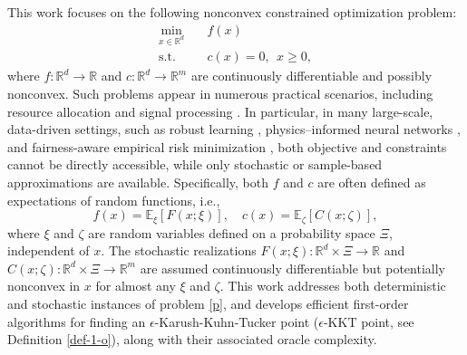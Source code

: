 \documentclass[11pt]{article}
\newcommand{\R}{\mathbb{R}}
\newcommand{\E}{\mathbb{E}}
\begin{document}
{This work focuses on} the following nonconvex constrained  optimization problem:
\begin{equation}\label{p}
\begin{aligned}
\min_{x \in \mathbb{R}^d} &\quad   f(x)  \\
\text{s.t.} &\quad c(x) = 0, ~~x \ge 0,
\end{aligned}
\end{equation}
where \(f: \R^d \to \R\) and \(c: \R^d \to \R^m\) are continuously differentiable and  possibly nonconvex. 
Such problems {appear in numerous practical scenarios,} including resource allocation \cite{yi2016initialization} and signal processing \cite{elbir2023twenty}. In particular, in many large-scale, data-driven settings, {such as} robust learning \cite{chamon2022constrained}, physics–informed neural networks \cite{cuomo2022scientific}, and fairness-aware empirical risk minimization \cite{donini2018empirical}, both objective and constraints cannot be directly accessible, while only stochastic or {sample-based} approximations are available. {Specifically, both $f$ and $c$ are often defined as expectations of random functions, i.e.,
\begin{equation}\label{inq-cons}
f(x) = \E_\xi [F(x; \xi)], \quad c(x) = \E_\zeta [C(x; \zeta)], 
\end{equation}
where \(\xi\) and \(\zeta\) are random variables defined on a probability space \(\Xi\), independent of \(x\).} The stochastic realizations \(F(x; \xi): \R^d \times \Xi \to \R\) and \(C(x; \zeta): \R^d \times \Xi \to \R^m\) are assumed continuously differentiable but potentially nonconvex in \(x\) for almost any \(\xi\) and \(\zeta\). {This work addresses} both deterministic and stochastic {instances of problem \eqref{p}, and develops efficient first-order algorithms for finding an}  \(\epsilon\)-Karush-Kuhn-Tucker point (\(\epsilon\)-KKT point, see Definition \ref{def-1-o}), along with their associated  oracle complexity. 
\end{document}
